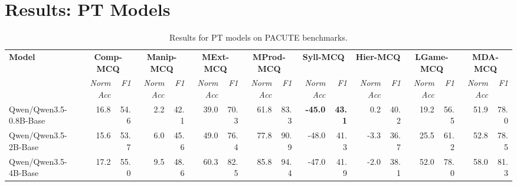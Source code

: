 \documentclass{article}
\begin{document}
\section*{Results: PT Models}

\begin{table}[htbp]
\centering
\caption{Results for PT models on PACUTE benchmarks.}
\label{tab:results-pt}
\begin{threeparttable}
\begin{adjustbox}{max width=\textwidth}
\begin{tabular}{lrrrrrrrrrrrrrrrr}
\toprule
\textbf{Model} & \multicolumn{2}{c}{\textbf{Comp-MCQ}} & \multicolumn{2}{c}{\textbf{Manip-MCQ}} & \multicolumn{2}{c}{\textbf{MExt-MCQ}} & \multicolumn{2}{c}{\textbf{MProd-MCQ}} & \multicolumn{2}{c}{\textbf{Syll-MCQ}} & \multicolumn{2}{c}{\textbf{Hier-MCQ}} & \multicolumn{2}{c}{\textbf{LGame-MCQ}} & \multicolumn{2}{c}{\textbf{MDA-MCQ}} \\
\cmidrule(lr){2-3}\cmidrule(lr){4-5}\cmidrule(lr){6-7}\cmidrule(lr){8-9}\cmidrule(lr){10-11}\cmidrule(lr){12-13}\cmidrule(lr){14-15}\cmidrule(lr){16-17}
 & \textit{NormAcc} & \textit{F1} & \textit{NormAcc} & \textit{F1} & \textit{NormAcc} & \textit{F1} & \textit{NormAcc} & \textit{F1} & \textit{NormAcc} & \textit{F1} & \textit{NormAcc} & \textit{F1} & \textit{NormAcc} & \textit{F1} & \textit{NormAcc} & \textit{F1} \\
\midrule
Qwen/Qwen3.5-0.8B-Base & \cellcolor[HTML]{FDF1EC}16.8 & \cellcolor[HTML]{FDF5F2}54.6 & \cellcolor[HTML]{FAD8C9}2.2 & \cellcolor[HTML]{FBE0D4}42.1 & \cellcolor[HTML]{F4A785}39.0 & \cellcolor[HTML]{F4A785}70.3 & \cellcolor[HTML]{FBE4DA}61.8 & \cellcolor[HTML]{FCECE5}83.3 & \cellcolor[HTML]{92C5DE}\textbf{-45.0} & \cellcolor[HTML]{92C5DE}\textbf{43.1} & \cellcolor[HTML]{ECF5F9}0.2 & \cellcolor[HTML]{EAF3F8}40.2 & \cellcolor[HTML]{F9D2C1}19.2 & \cellcolor[HTML]{FBDED1}56.5 & \cellcolor[HTML]{AAD2E5}51.9 & \cellcolor[HTML]{A4CEE3}78.0 \\
Qwen/Qwen3.5-2B-Base & \cellcolor[HTML]{FCE6DC}15.6 & \cellcolor[HTML]{FCEAE2}53.7 & \cellcolor[HTML]{FCEAE2}6.0 & \cellcolor[HTML]{FDF3EF}45.6 & \cellcolor[HTML]{FDEFE9}49.0 & \cellcolor[HTML]{FDF4F0}76.4 & \cellcolor[HTML]{D2E7F1}77.8 & \cellcolor[HTML]{C9E2EE}90.9 & \cellcolor[HTML]{EFF6FA}-48.0 & \cellcolor[HTML]{EDF5F9}41.3 & \cellcolor[HTML]{F4AB8A}-3.3 & \cellcolor[HTML]{F4AB8A}36.7 & \cellcolor[HTML]{FBE3D9}25.5 & \cellcolor[HTML]{FDF1EC}61.2 & \cellcolor[HTML]{A7D0E4}52.8 & \cellcolor[HTML]{A1CDE2}78.5 \\
Qwen/Qwen3.5-4B-Base & \cellcolor[HTML]{FDF5F1}17.2 & \cellcolor[HTML]{FEF9F7}55.0 & \cellcolor[HTML]{FEFBFA}9.5 & \cellcolor[HTML]{F7FBFC}48.6 & \cellcolor[HTML]{AFD4E6}60.3 & \cellcolor[HTML]{ACD2E5}82.5 & \cellcolor[HTML]{ABD2E5}85.8 & \cellcolor[HTML]{A7D0E4}94.4 & \cellcolor[HTML]{D0E6F0}-47.0 & \cellcolor[HTML]{CFE5F0}41.9 & \cellcolor[HTML]{F9D0BE}-2.0 & \cellcolor[HTML]{F9D1C0}38.1 & \cellcolor[HTML]{C7E1EE}52.0 & \cellcolor[HTML]{BBDAEA}78.0 & \cellcolor[HTML]{96C7DF}58.0 & \cellcolor[HTML]{95C6DF}81.3 \\

\end{tabular}
\end{adjustbox}
\end{threeparttable}
\end{table}
\end{document}
